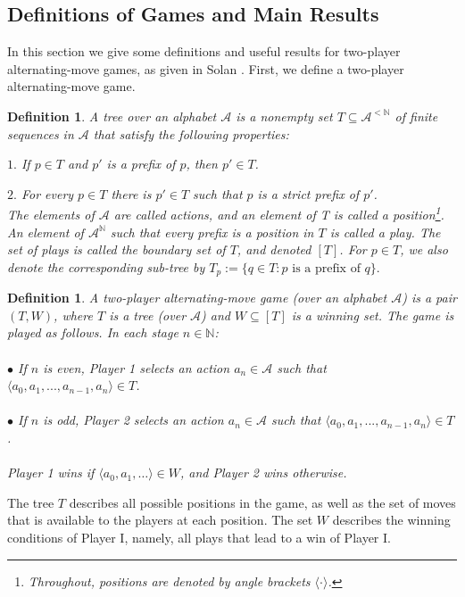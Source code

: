 \documentclass[a4,12pt]{article}%
\newtheorem{definition}[theorem]{Definition}
\newcommand{\N}{\mathbb{N}}
\begin{document}
\subsection{Definitions of Games and Main Results}
In this section we give some definitions and useful results for two-player alternating-move games, as given in Solan \cite{Solan}. First, we define a two-player alternating-move game.
\begin{definition}
    A \emph{tree} over an alphabet $\mathcal{A}$ is a nonempty set $T \subseteq \mathcal{A}^{<\N}$
of finite sequences in $\mathcal{A}$ that satisfy the following properties:

$1.$ If $p \in T$ and $p'$ is a prefix of $p$, then $p' \in T$.

$2.$ For every $p \in T$ there is $p'\in T$ such that $p$ is a strict prefix of $p'$.\\
The elements of $\mathcal{A}$ are called \emph{actions}, and an element of T is called a \emph{position}\footnote{Throughout, positions are denoted by angle brackets $\langle\cdot\rangle$.}. An element of $\mathcal{A}^\N$ such that every prefix is a position in $T$ is called a \emph{play}. The set of plays is called the \emph{boundary set} of $T$, and denoted $[T]$. For $p \in T$, we also denote the corresponding sub-tree by $T_p := \{q\in T : p \text{ is a prefix of } q \}.$

\end{definition}
\begin{definition}
    A \emph{two-player alternating-move game} (over an alphabet $\mathcal{A}$) is a pair $(T, W)$, where $T$ is a tree (over $\mathcal{A}$) and $W \subseteq [T]$ is a \emph{winning set}. The game is played as follows. In each stage $n \in \N$:
    \\
    \\
     $\bullet$ If $n$ is even, Player 1 selects an action $a_n \in \mathcal{A}$ such that $\langle a_0, a_1, . . . , a_{n-1}, a_n\rangle \in T$.
     \\
     \\
    $\bullet$ If $n$ is odd, Player 2 selects an action $a_n \in \mathcal{A}$ such that $\langle a_0, a_1, . . . , a_{n-1}, a_n\rangle \in T$.
    \\
    \\
    Player 1 wins if $\langle a_0, a_1, \dots \rangle \in W$, and Player 2 wins otherwise.
    \end{definition}
The tree $T$ describes all possible positions in the game, as well as the set of moves that is available to the players at each position. The set $W$ describes the winning conditions of Player I, namely, all plays that lead to a win of Player I.
\end{document}
